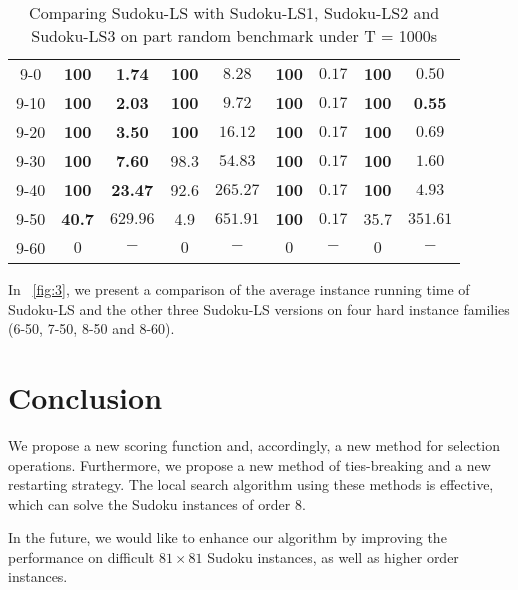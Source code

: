 \documentclass{article}
\begin{document}
\begin{table}[t]
{{\begin{tabular}{c|cc|cc|cc|cc}
            9-0  &  \textbf{100} & \textbf{1.74}  &  \textbf{100} & $8.28$  &  \textbf{100} & $0.17$  &  \textbf{100} & $0.50$ \\
            9-10  &  \textbf{100} & \textbf{2.03}  &  \textbf{100} & $9.72$  &  \textbf{100} & $0.17$  &  \textbf{100} & \textbf{0.55} \\
            9-20  &  \textbf{100} & \textbf{3.50}  &  \textbf{100} & $16.12$  &  \textbf{100} & $0.17$  &  \textbf{100} & $0.69$ \\
            9-30  &  \textbf{100} & \textbf{7.60}  &  98.3 & $54.83$  &  \textbf{100} & $0.17$  &  \textbf{100} & $1.60$ \\
            9-40  &  \textbf{100} & \textbf{23.47}  &  92.6 & $265.27$  &  \textbf{100} & $0.17$  &  \textbf{100} & $4.93$ \\
            9-50  &  \textbf{40.7} & $629.96$  &  4.9 & $651.91$  &  \textbf{100} & $0.17$  &  35.7 & $351.61$ \\
            9-60  &  $0$ & $-$  &  $0$ & $-$  &  $0$ & $-$  &  $0$ & $-$ \\
            
            \hline
        \end{tabular}
    }
    }
    \caption{Comparing Sudoku-LS with Sudoku-LS1, Sudoku-LS2 and Sudoku-LS3 on part random benchmark under T = 1000s}
    \label{tab:2}
\end{table}

In \figurename~\ref{fig:3}, we present a comparison of the average instance running time of Sudoku-LS and the other three Sudoku-LS versions on four hard instance families (6-50, 7-50, 8-50 and 8-60).

\section{Conclusion}

We propose a new scoring function and, accordingly, a new method for selection operations. Furthermore, we propose a new method of ties-breaking and a new restarting strategy. The local search algorithm using these methods is effective, which can solve the Sudoku instances of order 8.

In the future, we would like to enhance our algorithm by improving the performance on difficult $81 \times 81$ Sudoku instances, as well as higher order instances.



\end{document}
